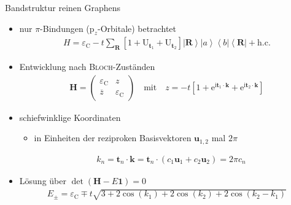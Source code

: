 \documentclass{beamer}
\newcommand \bra[1]{\left \langle #1 \right |}
\newcommand \ket[1]{\left | #1 \right \rangle}
\newcommand \bracks[1]{\left [ #1 \right ]}
\def \I {\mathrm i}
\def \E {\mathrm e}
\def \vec {\boldsymbol}
\newcommand \op[1]{\mathrm{#1}}
\newcommand \mat[1]{\begin{pmatrix} #1 \end{pmatrix}}
\def \eC {\varepsilon_\mathrm{C}}
\begin{document}
	\begin{frame}{Bandstruktur reinen Graphens}
		\begin{itemize}
			\item nur $\pi$-Bindungen ($\mathrm p_z$-Orbitale) betrachtet
			\begin{align*}
				H = \eC - t \sum_{\vec R} \bracks{1 + \op U_{\vec t_1} + \op U_{\vec t_2}} \ket{\vec R} \ket a \bra b \bra{\vec R} + \text{h.c.}
			\end{align*}
			\item Entwicklung nach \textsc{Bloch}-Zuständen
			\begin{align*}
				\vec H = \mat{\eC & z \\ \overline z & \eC} \quad \text{mit} \quad z = -t \bracks{1 + \E^{\I \vec t_1 \cdot \vec k} + \E^{\I \vec t_2 \cdot \vec k}}
			\end{align*}
			\item schiefwinklige Koordinaten
			\begin{itemize}
				\item in Einheiten der reziproken Basisvektoren $\vec u_{1, 2}$ mal $2 \pi$
			\end{itemize}
			\begin{align*}
				\quad k_n = \vec t_n \cdot \vec k = \vec t_n \cdot (c_1 \vec u_1 + c_2 \vec u_2) = 2 \pi c_n
			\end{align*}
			\item Lösung über $\det(\vec H - E \vec 1) = 0$
			\begin{align*}
				E_\pm = \eC \mp t \sqrt{3 + 2 \cos(k_1) + 2 \cos(k_2) + 2 \cos(k_2 - k_1)}
			\end{align*}
		\end{itemize}
	\end{frame}
	
\end{document}
